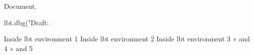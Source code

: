 \documentclass[a4paper,11pt]{article}
\begin{document}
  \lbtDebugModeOn{}

  Document.

  \begin{luacode*}
    lbt.dbg("Draft: %
  \end{luacode*}

  \begin{lbt}
    Inside lbt environment 1
    Inside lbt environment 2
    Inside lbt environment 3
      » and 4
    » and 5
  \end{lbt}
\end{document}
